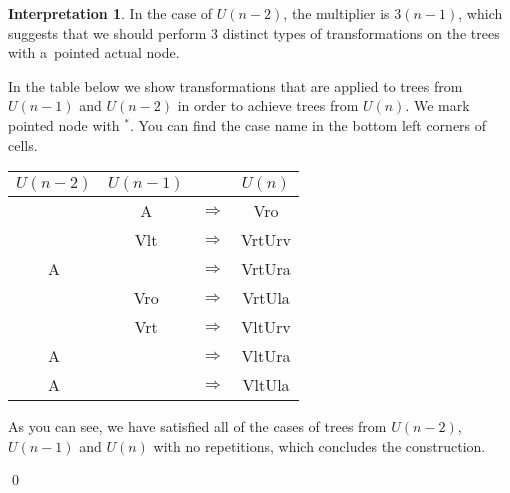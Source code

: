 \documentclass[final]{article}
\theoremstyle{definition}
\theoremstyle{definition}
\newtheorem{interpretation}{Interpretation}[subsection]
\theoremstyle{remark}
\newcommand{\pointed}[1]{\ensuremath{{#1}^*}}
\begin{document}
\begin{interpretation}
In the case of \(U(n-2)\), the multiplier is \(3(n-1)\), which suggests that we should perform \(3\) distinct types of transformations on the trees with a~pointed actual node.

In the table below we show transformations that are applied to trees from \(U(n-1)\) and \(U(n-2)\) in order to achieve trees from \(U(n)\). We mark pointed node with \(\pointed{}\). You can find the case name in the bottom left corners of cells.

\begin{center}
    \begin{longtable}{| c | c | c | c |}
        \hline

        \(U(n-2)\) &
        \(U(n-1)\) &
               &
        \(U(n)\)\\
        \hline

        &
        A  &
        \(\Rightarrow\)&
        Vro  \\
        \hline

        &
        Vlt  &
        \(\Rightarrow\)&
        VrtUrv  \\
        \hline

        A  &
        &
        \(\Rightarrow\)&
        VrtUra  \\
        \hline

        &
        Vro  &
        \(\Rightarrow\)&
        VrtUla  \\
        \hline

        &
        Vrt  &
        \(\Rightarrow\)&
        VltUrv  \\
        \hline

        A  &
        &
        \(\Rightarrow\)&
        VltUra  \\
        \hline

        A  &
        &
        \(\Rightarrow\)&
        VltUla  \\
        \hline
    \end{longtable}
\end{center}


As you can see, we have satisfied all of the cases of trees from \(U(n-2)\), \(U(n-1)\) and \(U(n)\) with no repetitions, which concludes the construction.

\qed%
\end{interpretation}
\end{document}
